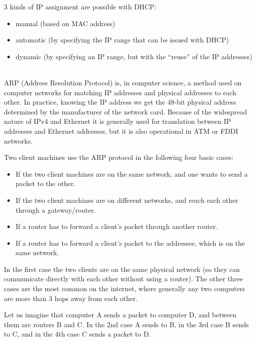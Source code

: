 \documentclass[margin=0px]{article}
\begin{document}
\begin{description}
        3 kinds of IP assignment are possible with DHCP:
        \begin{itemize}
            \item manual (based on MAC address)
            \item automatic (by specifying the IP range that can be issued with DHCP)
            \item dynamic (by specifying an IP range, but with the ``reuse'' of the IP addresses)
        \end{itemize}

    \item[ARP] \hfill \\
        ARP (Address Resolution Protocol) is, in computer science, a method used on computer networks for matching IP addresses and physical addresses to each other. In practice, knowing the IP address we get the 48-bit physical address determined by the manufacturer of the network card. Because of the widespread nature of IPv4 and Ethernet it is generally used for translation between IP addresses and Ethernet addresses, but it is also operational in ATM or FDDI networks.

        Two client machines use the ARP protocol in the following four basic cases:
        \begin{itemize}
            \item If the two client machines are on the same network, and one wants to send a packet to the other.
            \item If the two client machines are on different networks, and reach each other through a gateway/router.
            \item If a router has to forward a client's packet through another router.
            \item If a router has to forward a client's packet to the addressee, which is on the same network.
        \end{itemize}

        In the first case the two clients are on the same physical network (so they can communicate directly with each other without using a router). The other three cases are the most common on the internet, where generally any two computers are more than 3 hops away from each other.

        Let us imagine that computer A sends a packet to computer D, and between them are routers B and C. In the 2nd case A sends to B, in the 3rd case B sends to C, and in the 4th case C sends a packet to D.
\end{description}
\end{document}
